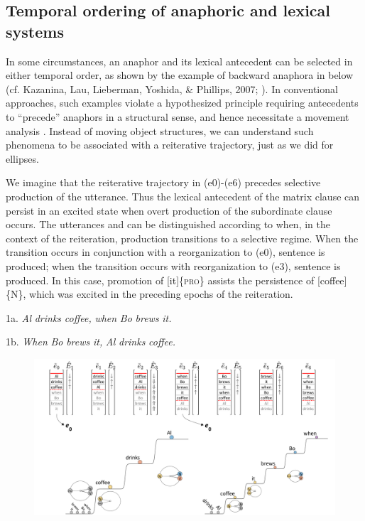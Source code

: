 \subsection{Temporal ordering of anaphoric and lexical systems}

In some circumstances, an anaphor and its lexical antecedent can be selected in either temporal order, as shown by the example of backward anaphora in  below (cf. Kazanina, Lau, Lieberman, Yoshida, \& Phillips, 2007; \citealt{ReulandAvrutin2005}). In conventional approaches, such examples violate a hypothesized principle requiring antecedents to “precede” anaphors in a structural sense, and hence necessitate a movement analysis \citep{Chomsky1993}. Instead of moving object structures, we can understand such phenomena to be associated with a reiterative trajectory, just as we did for ellipses.

  We imagine that the reiterative trajectory in (e0)-(e6) precedes selective production of the utterance. Thus the lexical antecedent of the matrix clause can persist in an excited state when overt production of the subordinate clause occurs. The utterances  and  can be distinguished according to when, in the context of the reiteration, production transitions to a selective regime. When the transition occurs in conjunction with a reorganization to (e0), sentence  is produced; when the transition occurs with reorganization to (e3), sentence  is produced. In this case, promotion of [it]\{\textsc{pro}\} assists the persistence of [coffee]\{N\}, which was excited in the preceding epochs of the reiteration.

1a. \textit{Al} \textit{drinks} \textit{coffee,} \textit{when} \textit{Bo} \textit{brews} \textit{it.}

1b. \textit{When} \textit{Bo} \textit{brews} \textit{it,} \textit{Al} \textit{drinks} \textit{coffee.}    

  
\begin{figure}
\includegraphics[width=\textwidth]{figures/Tilsen-img154.png}
\caption{\missingcaption}
\label{fig:}
\end{figure}
 

